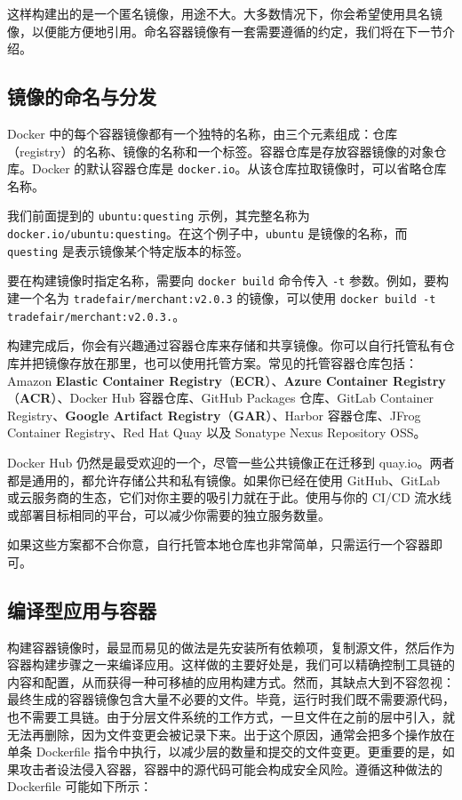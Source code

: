 这样构建出的是一个匿名镜像，用途不大。大多数情况下，你会希望使用具名镜像，以便能方便地引用。命名容器镜像有一套需要遵循的约定，我们将在下一节介绍。

\subsection{镜像的命名与分发}

Docker 中的每个容器镜像都有一个独特的名称，由三个元素组成：仓库（registry）的名称、镜像的名称和一个标签。容器仓库是存放容器镜像的对象仓库。Docker 的默认容器仓库是 \texttt{docker.io}。从该仓库拉取镜像时，可以省略仓库名称。

\label{idx:1752}
我们前面提到的 \texttt{ubuntu:questing} 示例，其完整名称为 \texttt{docker.\allowbreak{}io/\allowbreak{}ubuntu:questing}。在这个例子中，\texttt{ubuntu} 是镜像的名称，而 \texttt{questing} 是表示镜像某个特定版本的标签。

\label{idx:1753}
要在构建镜像时指定名称，需要向 \texttt{docker build} 命令传入 \texttt{-t} 参数。例如，要构建一个名为 \texttt{tradefair/\allowbreak{}merchant:v2.\allowbreak{}0.\allowbreak{}3} 的镜像，可以使用 \texttt{docker build -t tradefair/\allowbreak{}merchant:v2.\allowbreak{}0.\allowbreak{}3.\allowbreak{}}。

\label{idx:1754}
\label{idx:1755}
\label{idx:1756}
构建完成后，你会有兴趣通过容器仓库来存储和共享镜像。你可以自行托管私有仓库并把镜像存放在那里，也可以使用托管方案。常见的托管容器仓库包括：Amazon \textbf{Elastic Container Registry}（\textbf{ECR}）、\textbf{Azure Container Registry}（\textbf{ACR}）、Docker Hub 容器仓库、GitHub Packages 仓库、GitLab Container Registry、\textbf{Google Artifact Registry}（\textbf{GAR}）、Harbor 容器仓库、JFrog Container Registry、Red Hat Quay 以及 Sonatype Nexus Repository OSS。

Docker Hub 仍然是最受欢迎的一个，尽管一些公共镜像正在迁移到 quay.io。两者都是通用的，都允许存储公共和私有镜像。如果你已经在使用 GitHub、GitLab 或云服务商的生态，它们对你主要的吸引力就在于此。使用与你的 CI/CD 流水线或部署目标相同的平台，可以减少你需要的独立服务数量。

如果这些方案都不合你意，自行托管本地仓库也非常简单，只需运行一个容器即可。

\subsection{编译型应用与容器}

\label{idx:1757}
构建容器镜像时，最显而易见的做法是先安装所有依赖项，复制源文件，然后作为容器构建步骤之一来编译应用。这样做的主要好处是，我们可以精确控制工具链的内容和配置，从而获得一种可移植的应用构建方式。然而，其缺点大到不容忽视：最终生成的容器镜像包含大量不必要的文件。毕竟，运行时我们既不需要源代码，也不需要工具链。由于分层文件系统的工作方式，一旦文件在之前的层中引入，就无法再删除，因为文件变更会被记录下来。出于这个原因，通常会把多个操作放在单条 Dockerfile 指令中执行，以减少层的数量和提交的文件变更。更重要的是，如果攻击者设法侵入容器，容器中的源代码可能会构成安全风险。遵循这种做法的 Dockerfile 可能如下所示：

